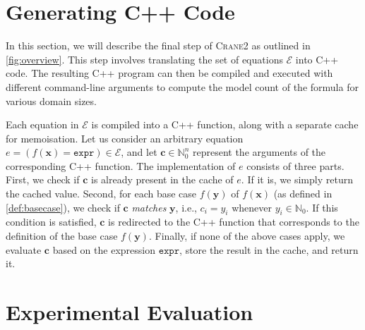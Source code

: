 \documentclass[letterpaper]{article} %
\theoremstyle{remark}
\theoremstyle{definition}
\newcommand{\expr}{\mathtt{expr}}
\newcommand{\Cranetwo}{\textsc{Crane2}}
\begin{document}
\section{Generating C++ Code}\label{sec:cpp}

In this section, we will describe the final step of \Cranetwo{} as outlined in
\cref{fig:overview}. This step involves translating the set of equations
$\mathcal{E}$ into C++ code. The resulting C++ program can then be compiled and
executed with different command-line arguments to compute the model count of the
formula for various domain sizes.

Each equation in $\mathcal{E}$ is compiled into a C++ function, along with a
separate cache for memoisation. Let us consider an arbitrary equation
$e = (f(\mathbf{x}) = \expr{}) \in \mathcal{E}$, and let
$\mathbf{c} \in \mathbb{N}_{0}^{n}$ represent the arguments of the corresponding
C++ function. The implementation of $e$ consists of three parts. First, we check
if $\mathbf{c}$ is already present in the cache of $e$. If it is, we simply
return the cached value. Second, for each base case $f(\mathbf{y})$ of
$f(\mathbf{x})$ (as defined in \cref{def:basecase}), we check if $\mathbf{c}$
\emph{matches} $\mathbf{y}$, i.e., $c_{i} = y_{i}$ whenever
$y_{i} \in \mathbb{N}_{0}$. If this condition is satisfied, $\mathbf{c}$ is
redirected to the C++ function that corresponds to the definition of the base
case $f(\mathbf{y})$. Finally, if none of the above cases apply, we evaluate
$\mathbf{c}$ based on the expression $\expr{}$, store the result in the cache,
and return it.

\section{Experimental Evaluation}\label{sec:experiments}



\end{document}
